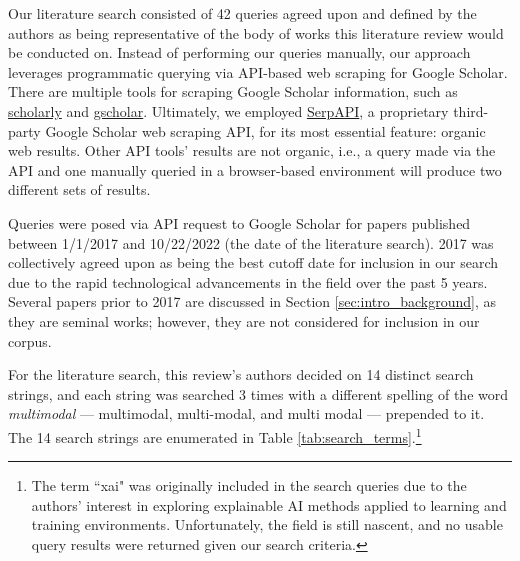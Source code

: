 \documentclass[manuscript,screen,review]{acmart}
\begin{document}
Our literature search consisted of 42 queries agreed upon and defined by the authors as being representative of the body of works this literature review would be conducted on. Instead of performing our queries manually, our approach leverages programmatic querying via API-based web scraping for Google Scholar. There are multiple tools for scraping Google Scholar information, such as \href{https://pypi.org/project/scholarly/}{scholarly} and \href{https://github.com/venthur/gscholar}{gscholar}. Ultimately, we employed \href{https://serpapi.com/google-scholar-api}{SerpAPI}, a proprietary third-party Google Scholar web scraping API, for its most essential feature: organic web results. Other API tools' results are not organic, i.e., a query made via the API and one manually queried in a browser-based environment will produce two different sets of results.

Queries were posed via API request to Google Scholar for papers published between 1/1/2017 and 10/22/2022 (the date of the literature search). 2017 was collectively agreed upon as being the best cutoff date for inclusion in our search due to the rapid technological advancements in the field over the past 5 years. Several papers prior to 2017 are discussed in Section \ref{sec:intro_background}, as they are seminal works; however, they are not considered for inclusion in our corpus. 

For the literature search, this review's authors decided on 14 distinct search strings, and each string was searched 3 times with a different spelling of the word \textit{multimodal} --- multimodal, multi-modal, and multi modal --- prepended to it. The 14 search strings are enumerated in Table \ref{tab:search_terms}.\footnote{The term ``xai" was originally included in the search queries due to the authors' interest in exploring explainable AI methods applied to learning and training environments. Unfortunately, the field is still nascent, and no usable query results were returned given our search criteria.}
\end{document}
